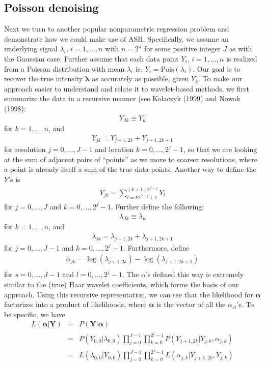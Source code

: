 \documentclass[12pt]{article}
\newcommand{\Ga}{\alpha}
\newcommand{\Gl}{\lambda}    \newcommand{\GL}{\Lambda}
\begin{document}
\subsection{Poisson denoising}
Next we turn to another popular nonparametric regression problem and demonstrate how we could make use of ASH. Specifically, we assume an underlying signal $\Gl_i$, $i=1,...,n$ with $n=2^J$ for some positive integer $J$ as with the Gaussian case. Further assume that each data point $Y_i$, $i=1,...,n$ is realized from a Poisson distribution with mean $\Gl_i$ ie. $Y_i=\textrm{Pois}(\Gl_i)$. Our goal is to recover the true intensity $\bm{\Gl}$ as accurately as possible, given $Y_k$. To make our approach easier to understand and relate it to wavelet-based methods, we first summarize the data in a recursive manner (see Kolaczyk (1999) and Nowak (1998):
\begin{eqnarray}Y_{Jk}\equiv Y_k\end{eqnarray}
for $k=1,...,n$, and
\begin{eqnarray}Y_{jk}=Y_{j+1,2k}+Y_{j+1,2k+1}\end{eqnarray}
for resolution $j=0,...,J-1$ and location $k=0,...,2^j-1$, so that we are looking at the sum of adjacent pairs of ``points'' as we move to coarser resolutions, where a point is already itself a sum of the true data points. Another way to define the $Y$'s is
\begin{eqnarray}Y_{jk}=\sum_{l=k2^{J-j}+1}^{(k+1)2^{J-j}}Y_l\end{eqnarray}
for $j=0,...,J$ and $k=0,...,2^j-1$.
Further define the following:
\begin{eqnarray}\Gl_{Jk}\equiv \Gl_k\end{eqnarray}
for $k=1,...,n$, and
\begin{eqnarray}\Gl_{jk}=\Gl_{j+1,2k}+\Gl_{j+1,2k+1}\end{eqnarray}
for $j=0,...,J-1$ and $k=0,...,2^j-1$. Furthermore, define
\begin{eqnarray}\label{eq:poisson wc}\Ga_{jk}=\log(\Gl_{j+1,2k})-\log(\Gl_{j+1,2k+1})\\\end{eqnarray}
for $s=0,...,J-1$ and $l=0,...,2^j-1$. The ${\Ga}$'s defined this way is extremely similar to the (true) Haar wavelet coefficients, which forms the basis of our approach. Using this recursive representation, we can see that the likelihood for $\bm{\Ga}$ factorizes into a product of likelihoods, where $\bm{\Ga}$ is the vector of all the $\Ga_{sl}$'s. To be specific, we have
\begin{eqnarray}
L(\bm{\Ga}|\mathbf{Y})&=&P(\mathbf{Y}|\bm{\Ga})\\
&=&P(Y_{0,0}|\Gl_{0,0})\prod_{j=0}^{J-1}\prod_{k=0}^{2^j-1}P(Y_{j+1,2k}|Y_{j,k},\Ga_{j,k})\\
&=&L(\Gl_{0,0}|Y_{0,0})\prod_{j=0}^{J-1}\prod_{k=0}^{2^j-1}L(\Ga_{j,k}|Y_{j+1,2k},Y_{j,k})
\end{eqnarray}
\end{document}
